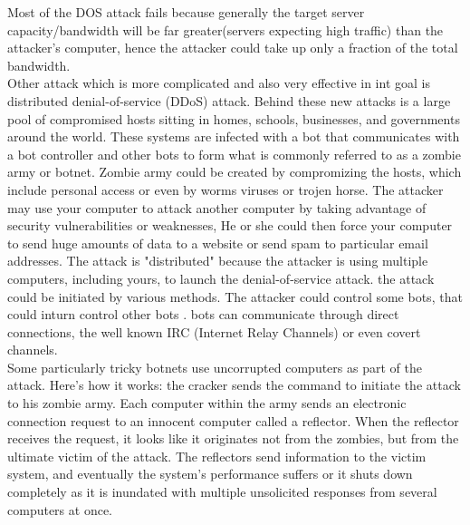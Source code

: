 \documentclass[12pt]{article}
\begin{document}
\indent Most of the DOS attack fails because generally the target server capacity/bandwidth will be far greater(servers expecting high traffic) than the attacker's computer, hence the attacker could take up only a fraction of the total bandwidth.\\

\indent Other attack which is more complicated and also very effective in int goal is distributed denial-of-service (DDoS) attack. 
Behind these new attacks is a large pool of compromised hosts sitting in homes, schools, businesses, and governments around the world. These systems are infected with a bot that communicates with a bot controller and other bots to form what is commonly referred to as a zombie army or botnet. Zombie army could be created by compromizing the hosts, which include personal access or even by worms viruses or trojen horse. The attacker may use your computer to attack another computer by taking advantage of security vulnerabilities or weaknesses, He or she could then force your computer to send huge amounts of data to a website or send spam to particular email addresses. The attack is "distributed" because the attacker is using multiple computers, including yours, to launch the denial-of-service attack. the attack could be initiated by various methods. The attacker could control some bots, that could inturn control other bots . bots can communicate through direct connections, the well known IRC (Internet Relay Channels) \cite{Cooke05thezombie} or even covert channels. \\

Some particularly tricky botnets use uncorrupted computers as part of the attack. Here's how it works: the cracker sends the command to initiate the attack to his zombie army. Each computer within the army sends an electronic connection request to an innocent computer called a reflector. When the reflector receives the request, it looks like it originates not from the zombies, but from the ultimate victim of the attack. The reflectors send information to the victim system, and eventually the system's performance suffers or it shuts down completely as it is inundated with multiple unsolicited responses from several computers at once. \\

\newpage
\end{document}
